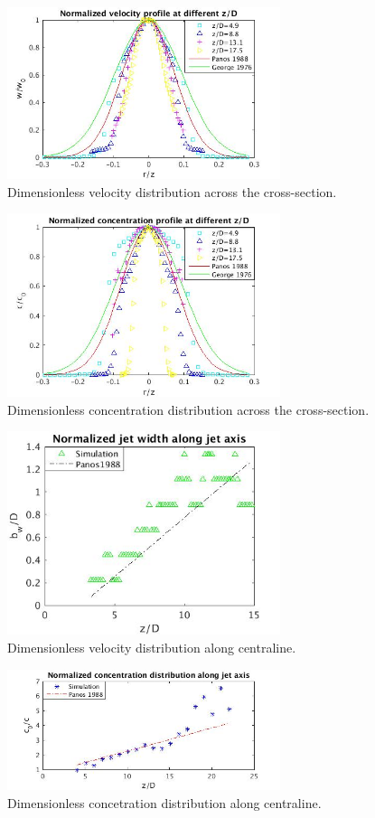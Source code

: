 \documentclass[journal abbreviation, manuscript]{copernicus}
\begin{document}
\begin{figure}
\includegraphics[width=8cm]{vel_cross}
\caption{Dimensionless velocity distribution across the cross-section.}
\label{fig:JPUE_cross-section_vel}
\end{figure}
\begin{figure}
\includegraphics[width=8cm]{conc_cross}
\caption{Dimensionless concentration distribution across the cross-section.}
\label{fig:JPUE_cross-section_conc}
\end{figure}
\begin{figure}
\includegraphics[width=8cm]{velo_along_axis}
\caption{Dimensionless velocity distribution along centraline.}
\label{fig:JPUE_along-axis_vel}
\end{figure}
\begin{figure}
\includegraphics[width=8cm]{conc_along_axis}
\caption{Dimensionless concetration distribution along centraline.}
\label{fig:JPUE_along-axis_conc}
\end{figure}
\end{document}
